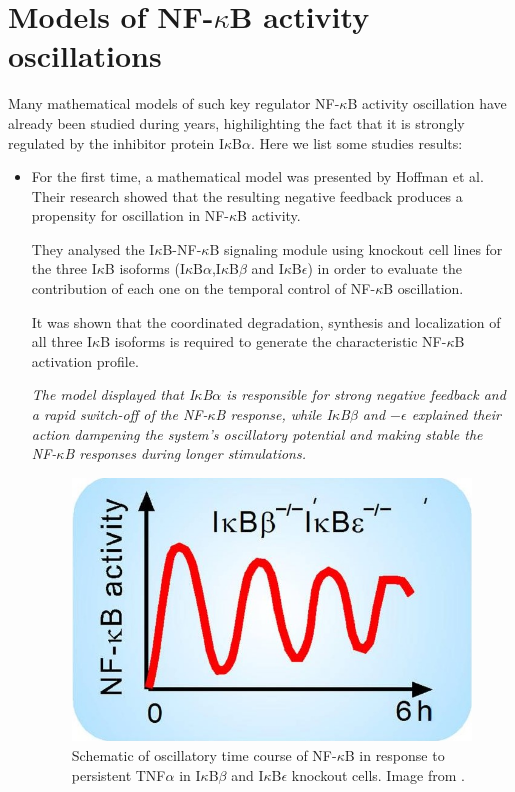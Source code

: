 \documentclass[12pt,a4paper]{report}
\begin{document}
\section{Models of NF-\texorpdfstring{$\kappa$}{}B activity oscillations}
Many mathematical models of such key regulator NF-$\kappa$B activity oscillation have already been studied during years, highilighting the fact that it is  strongly regulated by the inhibitor protein I$\kappa$B$\alpha$. Here we list some studies results:
\begin{itemize}
 \item For the first time, a mathematical model was presented by Hoffman et al. Their research showed that the resulting negative feedback produces a propensity for oscillation in NF-$\kappa$B activity. 
 
 They analysed the I$\kappa$B-NF-$\kappa$B signaling module using knockout cell lines for the three I$\kappa$B isoforms (I$\kappa$B$\alpha$,I$\kappa$B$\beta$ and I$\kappa$B$\epsilon$) in order to evaluate the contribution of each one on the temporal
 control of NF-$\kappa$B oscillation.
 
 It was shown that the coordinated degradation, synthesis and localization of all three I$\kappa$B isoforms is required to generate the characteristic NF-$\kappa$B
 activation profile.
 
 \emph{The model displayed that I$\kappa$B$\alpha$ is responsible for strong negative feedback
 and a rapid switch-off of the NF-$\kappa$B response, while I$\kappa$B$\beta$ and $-\epsilon$ explained their action dampening the system's oscillatory potential and making stable the NF-$\kappa$B responses during longer stimulations.}
 
 \begin{figure}[!ht]
 \centering
\includegraphics[scale=0.70]{NFkBOscillationProfileIkAlfa.jpg}
\caption{Schematic of oscillatory time course of NF-$\kappa$B in response to persistent TNF$\alpha$ in I$\kappa$B$\beta$ and I$\kappa$B$\epsilon$ knockout cells. Image from \cite{Hoffmanetal}.}
\label{NFkBOscillationProfileIkAlfa}
\end{figure}



\end{itemize}
\end{document}
